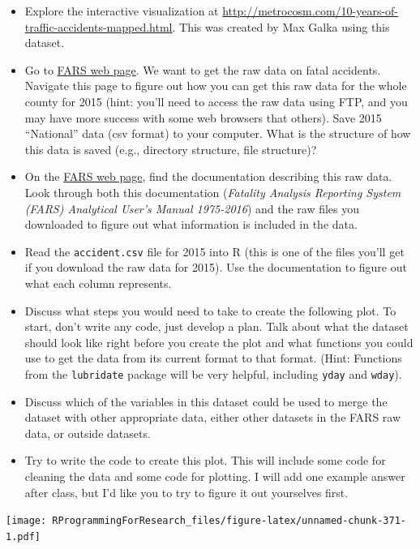 \documentclass[]{book}
\providecommand{\tightlist}{%
  \setlength{\itemsep}{0pt}\setlength{\parskip}{0pt}}
\theoremstyle{definition}
\theoremstyle{definition}
\theoremstyle{definition}
\theoremstyle{remark}
\begin{document}
\begin{itemize}
\tightlist
\item
  Explore the interactive visualization at
  \url{http://metrocosm.com/10-years-of-traffic-accidents-mapped.html}.
  This was created by Max Galka using this dataset.
\item
  Go to \href{http://www.nhtsa.gov/FARS}{FARS web page}. We want to get
  the raw data on fatal accidents. Navigate this page to figure out how
  you can get this raw data for the whole county for 2015 (hint: you'll
  need to access the raw data using FTP, and you may have more success
  with some web browsers that others). Save 2015 ``National'' data (csv
  format) to your computer. What is the structure of how this data is
  saved (e.g., directory structure, file structure)?
\item
  On the \href{http://www.nhtsa.gov/FARS}{FARS web page}, find the
  documentation describing this raw data. Look through both this
  documentation (\emph{Fatality Analysis Reporting System (FARS)
  Analytical User's Manual 1975-2016}) and the raw files you downloaded
  to figure out what information is included in the data.
\item
  Read the \texttt{accident.csv} file for 2015 into R (this is one of
  the files you'll get if you download the raw data for 2015). Use the
  documentation to figure out what each column represents.
\item
  Discuss what steps you would need to take to create the following
  plot. To start, don't write any code, just develop a plan. Talk about
  what the dataset should look like right before you create the plot and
  what functions you could use to get the data from its current format
  to that format. (Hint: Functions from the \texttt{lubridate} package
  will be very helpful, including \texttt{yday} and \texttt{wday}).
\item
  Discuss which of the variables in this dataset could be used to merge
  the dataset with other appropriate data, either other datasets in the
  FARS raw data, or outside datasets.
\item
  Try to write the code to create this plot. This will include some code
  for cleaning the data and some code for plotting. I will add one
  example answer after class, but I'd like you to try to figure it out
  yourselves first.
\end{itemize}

\texttt{[image: RProgrammingForResearch\_files/figure-latex/unnamed-chunk-371-1.pdf]}
\end{document}
